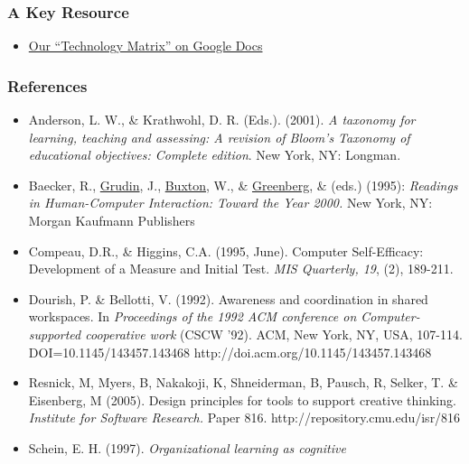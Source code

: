 \subsubsection{A Key Resource}

\begin{itemize}
\item
  \href{-https://docs.google.com/spreadsheet/ccc?key=0ApZ8\_aXL9go8dEUxeThxblhQWmVPbHdHdWpaLWxOWGc\#gid=0}{Our
  ``Technology Matrix'' on Google Docs}
\end{itemize}
\subsubsection{References}

\begin{itemize}
\item
  Anderson, L. W., \& Krathwohl, D. R. (Eds.). (2001). \emph{A taxonomy
  for learning, teaching and assessing: A revision of Bloom's Taxonomy
  of educational objectives: Complete edition}. New York, NY: Longman.
\item
  \href{http://www.interaction-design.org/references/authors/ronald\_m\_\_baecker.html}{}Baecker,
  R.,
  \href{http://www.interaction-design.org/references/authors/jonathan\_grudin.html}{Grudin},
  J.,
  \href{http://www.interaction-design.org/references/authors/william\_buxton.html}{Buxton},
  W., \&
  \href{http://www.interaction-design.org/references/authors/saul\_greenberg.html}{Greenberg},
  \& (eds.) (1995): \emph{Readings in Human-Computer Interaction: Toward
  the Year 2000.} New York, NY: Morgan Kaufmann Publishers
\item
  Compeau, D.R., \& Higgins, C.A. (1995, June). Computer Self-Efficacy:
  Development of a Measure and Initial Test. \emph{MIS Quarterly, 19},
  (2), 189-211.
\item
  Dourish, P. \& Bellotti, V. (1992). Awareness and coordination in
  shared workspaces. In \emph{Proceedings of the 1992 ACM conference on
  Computer-supported cooperative work} (CSCW '92). ACM, New York, NY,
  USA, 107-114. DOI=10.1145/143457.143468
  http://doi.acm.org/10.1145/143457.143468
\item
  Resnick, M, Myers, B, Nakakoji, K, Shneiderman, B, Pausch, R, Selker,
  T. \& Eisenberg, M (2005). Design principles for tools to support
  creative thinking. \emph{Institute for Software Research.} Paper 816.
  http://repository.cmu.edu/isr/816
\item
  Schein, E. H. (1997). \emph{Organizational learning as cognitive
}
\end{itemize}
